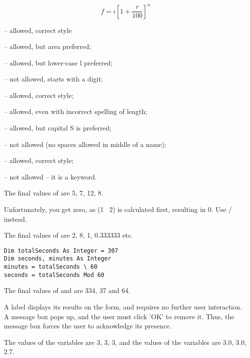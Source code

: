 \begin{enumChapter}
				\begin{equation*}
					f = i \left[ 1 + \frac{r}{100} \right]^n
				\end{equation*}
		\end{enumChapter}
		
		\begin{stab}
			\begin{enumChapter}
			\item	{} – allowed, correct style

						 – allowed, but area preferred;

						 – allowed, but lower-case l preferred;

						 – not allowed, starts with a digit;

						 – allowed, correct style;

					 – allowed, even with incorrect spelling of length;

					 – allowed, but capital S is preferred;

					 – not allowed (no spaces allowed in middle of a name);

					 – allowed, correct style;

					 – not allowed – it is a keyword.
				\item	The final values of  are 5, 7, 12, 8.
				\item	Unfortunately, you get zero, as (1 \ 2) is calculated first, resulting in 0. Use / instead.
				\item	The final values of  are 2, 8, 1, 0.333333 etc.
				\item	\begin{lstlisting}
Dim totalSeconds As Integer = 307
Dim seconds, minutes As Integer
minutes = totalSeconds \ 60
seconds = totalSeconds Mod 60
					\end{lstlisting}
				\item	The final values of  and  are 334, 37 and 64.
				\item	A label displays its results on the form, and requires no further user interaction. A message box pops up, and the user must click 'OK' to remove it. Thus, the message box forces the user to acknowledge its presence.
				\item	The values of the  variables  are 3, 3, 3, and the values of the  variables  are 3.0, 3.0, 2.7.
			\end{enumChapter}
		\end{stab}

